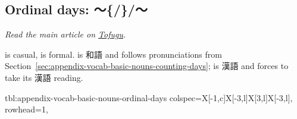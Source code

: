 \documentclass[../nihongo-gakushuu-kyouzai-supplementary.tex]{subfiles}
\begin{document}
\subsection{Ordinal days: 〜\{/\}/〜} \label{sec:appendix-vocab-basic-nouns-ordinal-days}
\emph{Read the main article on \href{https://www.tofugu.com/japanese/japanese-counter-ka-nichi/}{Tofugu}.}

 is casual,  is formal.  is 和語 and follows pronunciations from Section~\ref{sec:appendix-vocab-basic-nouns-counting-days};  is 漢語 and forces  to take its 漢語 reading.

{tbl:appendix-vocab-basic-nouns-ordinal-days}  %
{
    colspec={X[-1,c]X[-3,l]X[3,l]X[-3,l]},
    rowhead=1,
}  %
\end{document}

